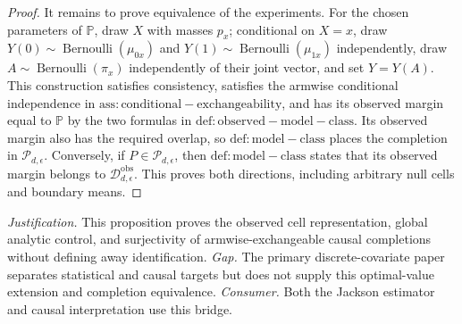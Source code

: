 \documentclass{article}
\begin{document}
\begin{proof}
It remains to prove equivalence of the experiments.  For the chosen parameters of \(\mathbb P\), draw \(X\) with masses \(p_x\); conditional on \(X=x\), draw \(Y(0)\sim\operatorname{Bernoulli}(\mu_{0x})\) and \(Y(1)\sim\operatorname{Bernoulli}(\mu_{1x})\) independently, draw \(A\sim\operatorname{Bernoulli}(\pi_x)\) independently of their joint vector, and set \(Y=Y(A)\).  This construction satisfies consistency, satisfies the armwise conditional independence in \(\mathrm{ass:conditional-exchangeability}\), and has its observed margin equal to \(\mathbb P\) by the two formulas in \(\mathrm{def:observed-model-class}\).  Its observed margin also has the required overlap, so \(\mathrm{def:model-class}\) places the completion in \(\mathcal P_{d,\epsilon}\).  Conversely, if \(P\in\mathcal P_{d,\epsilon}\), then \(\mathrm{def:model-class}\) states that its observed margin belongs to \(\mathcal D_{d,\epsilon}^{\mathrm{obs}}\).  This proves both directions, including arbitrary null cells and boundary means.
\end{proof}
\par\smallskip\noindent \textit{Justification.} This proposition proves the observed cell representation, global analytic control, and surjectivity of armwise-exchangeable causal completions without defining away identification. \textit{Gap.} The primary discrete-covariate paper separates statistical and causal targets but does not supply this optimal-value extension and completion equivalence. \textit{Consumer.} Both the Jackson estimator and causal interpretation use this bridge.
\end{document}
